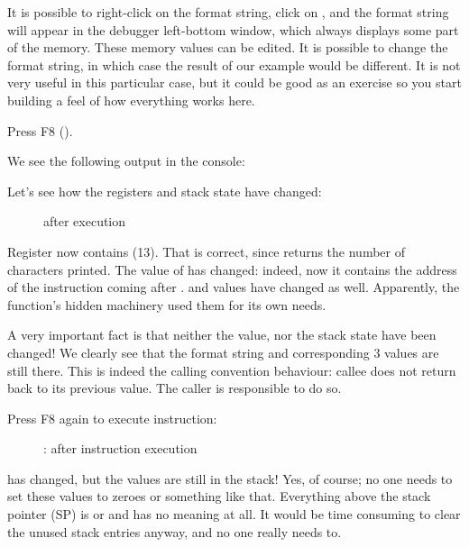 It is possible to right-click on the format string, click on ,
and the format string will appear in the debugger left-bottom window, which always displays some part of the memory.
These memory values can be edited.
It is possible to change the format string, in which case the result of our example would be different.
It is not very useful in this particular case, but it could be good as an exercise so you start building a feel of how everything works here.

\clearpage
Press F8 (\stepover).

We see the following output in the console:



Let's see how the registers and stack state have changed: 

\begin{figure}[H]
\centering
{}
\caption{\olly after \printf{} execution}
\label{fig:printf3_olly_3}
\end{figure}

Register \EAX now contains  (13).
That is correct, since \printf returns the number of characters printed. 
The value of \EIP has changed: indeed, now it contains the address of the instruction coming after 
.
\ECX and \EDX values have changed as well.
Apparently, the \printf function's hidden machinery used them for its own needs.

A very important fact is that neither the \ESP value, nor the stack state have been changed!
We clearly see that the format string and corresponding 3 values are still there.
This is indeed the  calling convention behaviour: \gls{callee} does not return \ESP back to its previous value.
The \gls{caller} is responsible to do so.

\clearpage
Press F8 again to execute  instruction:

\begin{figure}[H]
\centering
{}
\caption{\olly: after  instruction execution}
\label{fig:printf3_olly_4}
\end{figure}

\ESP has changed, but the values are still in the stack!
Yes, of course; no one needs to set these values to zeroes or something like that.
Everything above the stack pointer (\ac{SP}) 
is  or \IT{\garbage{}} and has no meaning at all.
It would be time consuming to clear the unused stack entries anyway, and no one really needs to.

